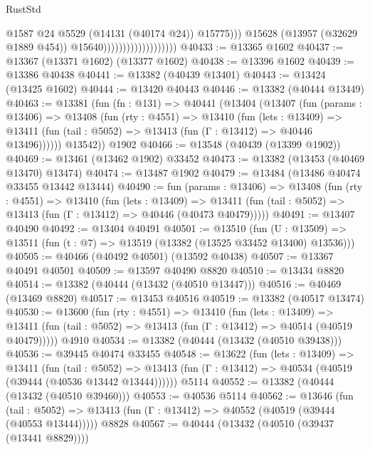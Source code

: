 \begin{lexlean}{RustStd}
\begin{coremodule}
                                                @1587
                                                @24
                                                @5529
                                                (@14131 (@40174 @24))
                                                @15775)))
                                          @15628
                                          (@13957 (@32629 @1889 @454))
                                          @15640)))))))))))))))))))
@40433 := @13365 @1602
@40437 := @13367 (@13371 @1602) (@13377 @1602)
@40438 := @13396 @1602
@40439 := @13386 @40438
@40441 := @13382 (@40439 @13401)
@40443 := @13424 (@13425 @1602)
@40444 := @13420 @40443
@40446 := @13382 (@40444 @13449)
@40463 := @13381
    (fun (fn : @131) =>
    @40441
      (@13404
        (@13407
          (fun (params : @13406) =>
          @13408
            (fun (rty : @4551) =>
            @13410
              (fun (lets : @13409) =>
              @13411 (fun (tail : @5052) => @13413 (fun (Γ : @13412) => @40446 @13496))))))
        @13542))
    @1902
@40466 := @13548 (@40439 (@13399 @1902))
@40469 := @13461 (@13462 @1902) @33452
@40473 := @13382 (@13453 (@40469 @13470) @13474)
@40474 := @13487 @1902
@40479 := @13484 (@13486 @40474 @33455 @13442 @13444)
@40490 := fun (params : @13406) =>
  @13408
    (fun (rty : @4551) =>
    @13410
      (fun (lets : @13409) =>
      @13411 (fun (tail : @5052) => @13413 (fun (Γ : @13412) => @40446 (@40473 @40479)))))
@40491 := @13407 @40490
@40492 := @13404 @40491
@40501 := @13510
    (fun (U : @13509) => @13511 (fun (t : @7) => @13519 (@13382 (@13525 @33452 @13400) @13536)))
@40505 := @40466 (@40492 @40501) (@13592 @40438)
@40507 := @13367 @40491 @40501
@40509 := @13597 @40490 @8820
@40510 := @13434 @8820
@40514 := @13382 (@40444 (@13432 (@40510 @13447)))
@40516 := @40469 (@13469 @8820)
@40517 := @13453 @40516
@40519 := @13382 (@40517 @13474)
@40530 := @13600
    (fun (rty : @4551) =>
    @13410
      (fun (lets : @13409) =>
      @13411 (fun (tail : @5052) => @13413 (fun (Γ : @13412) => @40514 (@40519 @40479)))))
    @4910
@40534 := @13382 (@40444 (@13432 (@40510 @39438)))
@40536 := @39445 @40474 @33455
@40548 := @13622
    (fun (lets : @13409) =>
    @13411
      (fun (tail : @5052) =>
      @13413 (fun (Γ : @13412) => @40534 (@40519 (@39444 (@40536 @13442 @13444))))))
    @5114
@40552 := @13382 (@40444 (@13432 (@40510 @39460)))
@40553 := @40536 @5114
@40562 := @13646
    (fun (tail : @5052) => @13413 (fun (Γ : @13412) => @40552 (@40519 (@39444 (@40553 @13444)))))
    @8828
@40567 := @40444 (@13432 (@40510 (@39437 (@13441 @8829))))

\end{coremodule}
\end{lexlean}
